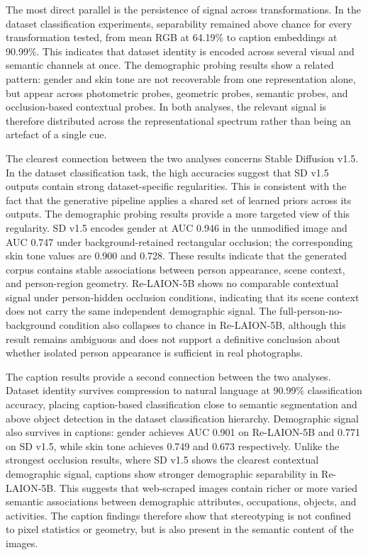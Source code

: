 The most direct parallel is the persistence of signal across transformations. In the dataset classification experiments, separability remained above chance for every transformation tested, from mean RGB at 64.19\% to caption embeddings at 90.99\%. This indicates that dataset identity is encoded across several visual and semantic channels at once. The demographic probing results show a related pattern: gender and skin tone are not recoverable from one representation alone, but appear across photometric probes, geometric probes, semantic probes, and occlusion-based contextual probes. In both analyses, the relevant signal is therefore distributed across the representational spectrum rather than being an artefact of a single cue.

The clearest connection between the two analyses concerns Stable Diffusion v1.5. In the dataset classification task, the high accuracies suggest that SD v1.5 outputs contain strong dataset-specific regularities. This is consistent with the fact that the generative pipeline applies a shared set of learned priors across its outputs. The demographic probing results provide a more targeted view of this regularity. SD v1.5 encodes gender at AUC 0.946 in the unmodified image and AUC 0.747 under background-retained rectangular occlusion; the corresponding skin tone values are 0.900 and 0.728. These results indicate that the generated corpus contains stable associations between person appearance, scene context, and person-region geometry. Re-LAION-5B shows no comparable contextual signal under person-hidden occlusion conditions, indicating that its scene context does not carry the same independent demographic signal. The full-person-no-background condition also collapses to chance in Re-LAION-5B, although this result remains ambiguous and does not support a definitive conclusion about whether isolated person appearance is sufficient in real photographs.

The caption results provide a second connection between the two analyses. Dataset identity survives compression to natural language at 90.99\% classification accuracy, placing caption-based classification close to semantic segmentation and above object detection in the dataset classification hierarchy. Demographic signal also survives in captions: gender achieves AUC 0.901 on Re-LAION-5B and 0.771 on SD v1.5, while skin tone achieves 0.749 and 0.673 respectively. Unlike the strongest occlusion results, where SD v1.5 shows the clearest contextual demographic signal, captions show stronger demographic separability in Re-LAION-5B. This suggests that web-scraped images contain richer or more varied semantic associations between demographic attributes, occupations, objects, and activities. The caption findings therefore show that stereotyping is not confined to pixel statistics or geometry, but is also present in the semantic content of the images.

